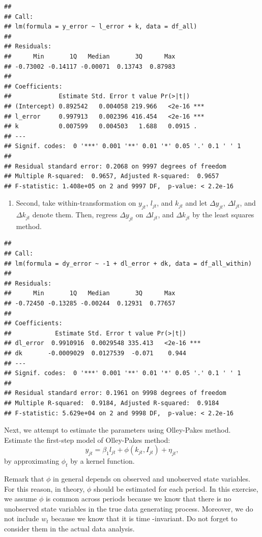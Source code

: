 \documentclass[
]{book}
\providecommand{\tightlist}{%
  \setlength{\itemsep}{0pt}\setlength{\parskip}{0pt}}
\begin{document}
\begin{verbatim}
## 
## Call:
## lm(formula = y_error ~ l_error + k, data = df_all)
## 
## Residuals:
##      Min       1Q   Median       3Q      Max 
## -0.73002 -0.14117 -0.00071  0.13743  0.87983 
## 
## Coefficients:
##             Estimate Std. Error t value Pr(>|t|)    
## (Intercept) 0.892542   0.004058 219.966   <2e-16 ***
## l_error     0.997913   0.002396 416.454   <2e-16 ***
## k           0.007599   0.004503   1.688   0.0915 .  
## ---
## Signif. codes:  0 '***' 0.001 '**' 0.01 '*' 0.05 '.' 0.1 ' ' 1
## 
## Residual standard error: 0.2068 on 9997 degrees of freedom
## Multiple R-squared:  0.9657, Adjusted R-squared:  0.9657 
## F-statistic: 1.408e+05 on 2 and 9997 DF,  p-value: < 2.2e-16
\end{verbatim}

\begin{enumerate}
\def\labelenumi{\arabic{enumi}.}
\setcounter{enumi}{1}
\tightlist
\item
  Second, take within-transformation on \(y_{jt}\), \(l_{jt}\), and \(k_{jt}\) and let \(\Delta y_{jt}\), \(\Delta l_{jt}\), and \(\Delta k_{jt}\) denote them. Then, regress \(\Delta y_{jt}\) on \(\Delta l_{jt}\), and \(\Delta k_{jt}\) by the least squares method.
\end{enumerate}

\begin{verbatim}
## 
## Call:
## lm(formula = dy_error ~ -1 + dl_error + dk, data = df_all_within)
## 
## Residuals:
##      Min       1Q   Median       3Q      Max 
## -0.72450 -0.13285 -0.00244  0.12931  0.77657 
## 
## Coefficients:
##            Estimate Std. Error t value Pr(>|t|)    
## dl_error  0.9910916  0.0029548 335.413   <2e-16 ***
## dk       -0.0009029  0.0127539  -0.071    0.944    
## ---
## Signif. codes:  0 '***' 0.001 '**' 0.01 '*' 0.05 '.' 0.1 ' ' 1
## 
## Residual standard error: 0.1961 on 9998 degrees of freedom
## Multiple R-squared:  0.9184, Adjusted R-squared:  0.9184 
## F-statistic: 5.629e+04 on 2 and 9998 DF,  p-value: < 2.2e-16
\end{verbatim}

Next, we attempt to estimate the parameters using Olley-Pakes method. Estimate the first-step model of Olley-Pakes method:
\[
y_{jt} = \beta_1 l_{jt} + \phi(k_{jt}, I_{jt}) + \eta_{jt},
\]
by approximating \(\phi_t\) by a kernel function.

Remark that \(\phi\) in general depends on observed and unobserved state variables. For this reason, in theory, \(\phi\) should be estimated for each period. In this exercise, we assume \(\phi\) is common across periods because we know that there is no unobserved state variables in the true data generating process. Moreover, we do not include \(w_t\) because we know that it is time -invariant. Do not forget to consider them in the actual data analysis.
\end{document}
